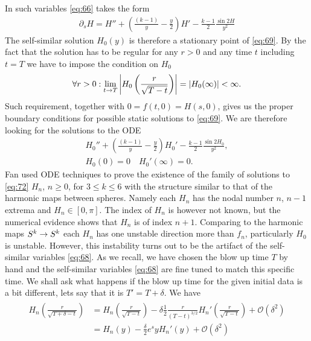 
In such variables \eqref{eq:66} takes the form
\begin{align}
  \label{eq:69}
  \partial_s
  H=H''+\left(\frac{(k-1)}{y}-\frac{y}{2}\right)H'-\frac{k-1}{2}\frac{\sin2H}{y^2}
\end{align}
The self-similar solution $H_0(y)$ is therefore a stationary point of
\eqref{eq:69}. By the fact that the solution has to be regular for any
$r>0$ and any time $t$ including $t=T$ we have to impose the condition
on $H_0$
\begin{align}
  \label{eq:71}
  \forall{r>0}:\lim_{t\rightarrow T}
  \left|H_0\left(\frac{r}{\sqrt{T-t}}\right)\right|=\left|H_0(\infty)\right|<\infty.
\end{align}
Such requirement, together with $0=f(t,0)=H(s,0)$, gives us the proper
boundary conditions for possible static solutions to \eqref{eq:69}. We
are therefore looking for the solutions to the ODE
\begin{align}
  \label{eq:72}
  H_0''+\left(\frac{(k-1)}{y}-\frac{y}{2}\right)H_0'-\frac{k-1}{2}\frac{\sin2H_0}{y^2},\\
  H_0(0)=0\quad H_0'(\infty)=0.
\end{align}
Fan \cite{Fan1999} used ODE techniques to prove the existence of the
family of solutions to \eqref{eq:72} $H_n$, $n\ge0$, for $3\le k\le6$
with the structure similar to that of the harmonic maps between
spheres. Namely each $H_n$ has the nodal number $n$, $n-1$ extrema and
$H_n\in[0,\pi]$. The index of $H_n$ is however not known, but the
numerical evidence shows that $H_n$ is of index $n+1$. Comparing to
the harmonic maps $S^k\rightarrow S^k$ each $H_n$ has one unstable direction
more than $f_n$, particularly $H_0$ is unstable. However, this
instability turns out to be the artifact of the self-similar variables
\eqref{eq:68}. As we recall, we have chosen the blow up time $T$ by
hand and the self-similar variables \eqref{eq:68} are fine tuned to
match this specific time. We shall ask what happens if the blow up
time for the given initial data is a bit different, lets say that it
is $T'=T+\delta$. We have
\begin{align}
  \label{eq:87}
  \begin{split}
    H_n\left(\frac{r}{\sqrt{T+\delta-t}}\right)
    &=H_n\left(\frac{r}{\sqrt{T-t}}\right)-\delta\frac{1}{2}\frac{r}{(T-t)^{3/2}}H_n'\left(\frac{r}{\sqrt{T-t}}\right)+\mathcal{O}(\delta^2)\\
    &=H_n(y)-\frac{\delta}{2} e^{s}
    yH_n'(y)+\mathcal{O}(\delta^2)
  \end{split}
\end{align}
